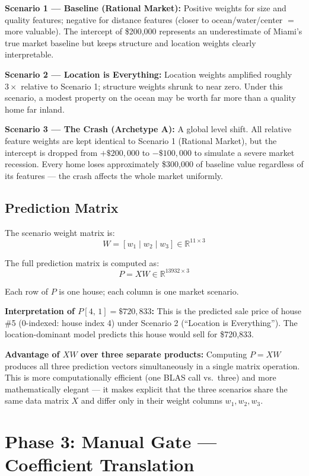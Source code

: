\documentclass[11pt]{article}
\begin{document}
\textbf{Scenario 1 --- Baseline (Rational Market):} Positive weights for size and quality features; negative for distance features (closer to ocean/water/center $=$ more valuable). The intercept of \$200,000 represents an underestimate of Miami's true market baseline but keeps structure and location weights clearly interpretable.

\textbf{Scenario 2 --- Location is Everything:} Location weights amplified roughly $3\times$ relative to Scenario 1; structure weights shrunk to near zero. Under this scenario, a modest property on the ocean may be worth far more than a quality home far inland.

\textbf{Scenario 3 --- The Crash (Archetype A):} A global level shift. All relative feature weights are kept identical to Scenario 1 (Rational Market), but the intercept is dropped from $+\$200{,}000$ to $-\$100{,}000$ to simulate a severe market recession. Every home loses approximately \$300,000 of baseline value regardless of its features --- the crash affects the whole market uniformly.

\subsection*{Prediction Matrix}

The scenario weight matrix is:
\[
W = [w_1 \mid w_2 \mid w_3] \in \mathbb{R}^{11 \times 3}
\]

The full prediction matrix is computed as:
\[
P = XW \in \mathbb{R}^{13932 \times 3}
\]

Each row of $P$ is one house; each column is one market scenario.

\textbf{Interpretation of $P[4,\,1] = \$720{,}833$:} This is the predicted sale price of house \#5 (0-indexed: house index 4) under Scenario 2 (``Location is Everything''). The location-dominant model predicts this house would sell for \$720,833.

\textbf{Advantage of $XW$ over three separate products:} Computing $P = XW$ produces all three prediction vectors simultaneously in a single matrix operation. This is more computationally efficient (one BLAS call vs.\ three) and more mathematically elegant --- it makes explicit that the three scenarios share the same data matrix $X$ and differ only in their weight columns $w_1, w_2, w_3$.

\section{Phase 3: Manual Gate --- Coefficient Translation}
\end{document}
